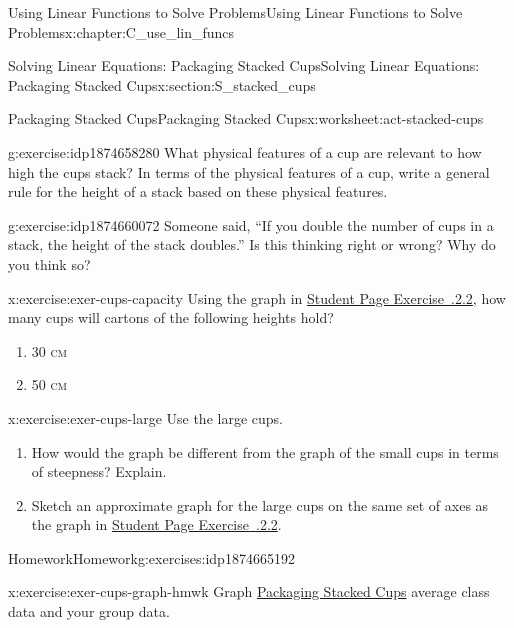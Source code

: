 \documentclass[oneside,10pt,]{book}
\newcommand{\xreffont}{\relax}
\newcommand{\initialism}[1]{\textsc{\MakeLowercase{#1}}}
\numberwithin{equation}{chapter}
\begin{document}
\begin{chapterptx}{Using Linear Functions to Solve Problems}{}{Using Linear Functions to Solve Problems}{}{}{x:chapter:C_use_lin_funcs}
\begin{sectionptx}{Solving Linear Equations: Packaging Stacked Cups}{}{Solving Linear Equations: Packaging Stacked Cups}{}{}{x:section:S_stacked_cups}
\begin{worksheet-subsection}{Packaging Stacked Cups}{}{Packaging Stacked Cups}{}{}{x:worksheet:act-stacked-cups}
\begin{divisionexercise}{5}{}{}{g:exercise:idp1874658280}%
What physical features of a cup are relevant to how high the cups stack? In terms of the physical features of a cup, write a general rule for the height of a stack based on these physical features.%
\end{divisionexercise}%
\begin{divisionexercise}{6}{}{}{g:exercise:idp1874660072}%
Someone said, ``If you double the number of cups in a stack, the height of the stack doubles.'' Is this thinking right or wrong? Why do you think so?%
\end{divisionexercise}%
\begin{divisionexercise}{7}{}{}{x:exercise:exer-cups-capacity}%
Using the graph in \hyperlink{x:exercise:exer-cups-graph}{Student Page Exercise~{\xreffont 3.2.2.2}}, how many cups will cartons of the following heights hold?%
\begin{enumerate}[font=\bfseries,label=(\alph*),ref=\alph*]
\item{}30 \initialism{cm}%
\item{}50 \initialism{cm}%
\end{enumerate}
\end{divisionexercise}%
\begin{divisionexercise}{8}{}{}{x:exercise:exer-cups-large}%
Use the large cups.%
\begin{enumerate}[font=\bfseries,label=(\alph*),ref=\alph*]
\item{}How would the graph be different from the graph of the small cups in terms of steepness? Explain.%
\item{}Sketch an approximate graph for the large cups on the same set of axes as the graph in \hyperlink{x:exercise:exer-cups-graph}{Student Page Exercise~{\xreffont 3.2.2.2}}.%
\end{enumerate}
\end{divisionexercise}%
\end{worksheet-subsection}
\restoregeometry
%
%
\typeout{************************************************}
\typeout{************************************************}
%
\begin{exercises-subsection}{Homework}{}{Homework}{}{}{g:exercises:idp1874665192}
\begin{divisionexercise}{1}{}{}{x:exercise:exer-cups-graph-hmwk}%
Graph \hyperref[x:worksheet:act-stacked-cups]{Packaging Stacked Cups} average class data and your group data.%
\begin{enumerate}[font=\bfseries,label=(\alph*),ref=\alph*]

\end{enumerate}
\end{divisionexercise}
\end{exercises-subsection}
\end{sectionptx}
\end{chapterptx}
\end{document}
